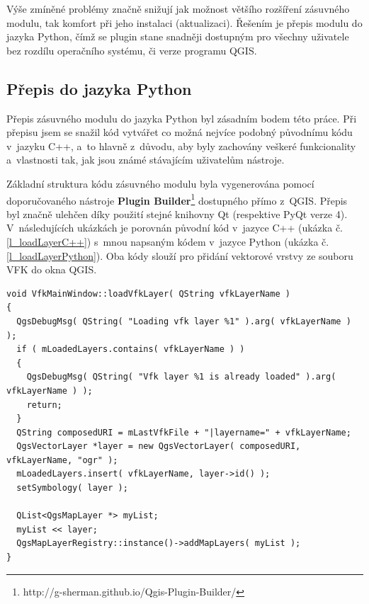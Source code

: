 \documentclass[a4paper,12pt,oneside]{book}
\begin{document}
Výše zmíněné problémy značně snižují jak možnost většího rozšíření zásuvného modulu, tak komfort při jeho instalaci (aktualizaci). Řešením je přepis modulu do jazyka Python, čímž se plugin stane snadněji dostupným pro všechny uživatele bez rozdílu operačního systému, či verze programu QGIS.

\subsection{Přepis do jazyka Python}
Přepis zásuvného modulu do jazyka Python byl zásadním bodem této práce. Při přepisu jsem se snažil kód vytvářet co možná nejvíce podobný původnímu kódu v~jazyku C++, a~to hlavně z~důvodu, aby byly zachovány veškeré funkcionality a~vlastnosti tak, jak jsou známé stávajícím uživatelům nástroje.

Základní struktura kódu zásuvného modulu byla vygenerována pomocí doporučovaného nástroje \textbf{Plugin Builder}\footnote{http://g-sherman.github.io/Qgis-Plugin-Builder/} dostupného přímo z~QGIS. Přepis byl značně ulehčen díky použití stejné knihovny Qt (respektive PyQt verze 4). V~následujících ukázkách je porovnán původní kód v~jazyce C++ (ukázka č. \ref{l_loadLayerC++}) s~mnou napsaným kódem v~jazyce Python (ukázka č. \ref{l_loadLayerPython}). Oba kódy slouží pro přidání vektorové vrstvy ze souboru VFK do okna QGIS.

\begin{lstlisting}[style=c++, 
		    caption=Kód pro načtení vektorové vrstvy v~C++, 
		    label=l_loadLayerC++]
 void VfkMainWindow::loadVfkLayer( QString vfkLayerName )
{
  QgsDebugMsg( QString( "Loading vfk layer %1" ).arg( vfkLayerName ) );
  if ( mLoadedLayers.contains( vfkLayerName ) )
  {
    QgsDebugMsg( QString( "Vfk layer %1 is already loaded" ).arg( vfkLayerName ) );
    return;
  }
  QString composedURI = mLastVfkFile + "|layername=" + vfkLayerName;
  QgsVectorLayer *layer = new QgsVectorLayer( composedURI, vfkLayerName, "ogr" );
  mLoadedLayers.insert( vfkLayerName, layer->id() );
  setSymbology( layer );

  QList<QgsMapLayer *> myList;
  myList << layer;
  QgsMapLayerRegistry::instance()->addMapLayers( myList );
}
\end{lstlisting}
\end{document}
